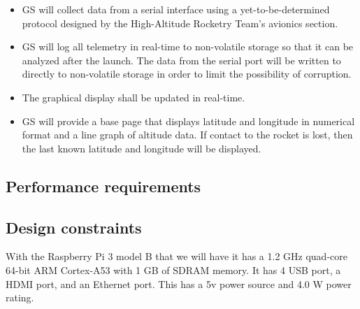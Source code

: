 \documentclass[10pt,journal,draftclsnofoot,onecolumn]{IEEEtran}
\begin{document}
	\begin{itemize}
		\item GS will collect data from a serial interface using a yet-to-be-determined protocol designed by the High-Altitude Rocketry Team's avionics section.
		\item GS will log all telemetry in real-time to non-volatile storage so that it can be analyzed
		after the launch.
		The data from the serial port will be written to directly to non-volatile storage in order to limit
		the possibility of corruption.
		\item The graphical display shall be updated in real-time.
		\item GS will provide a base page that displays latitude and longitude in numerical format and
		a line graph of altitude data.
		If contact to the rocket is lost, then the last known latitude and longitude will be displayed.	


	\end{itemize}
	
	\subsection{Performance requirements}
	\subsection{Design constraints}
	With the Raspberry Pi 3 model B that we will have it has a 1.2 GHz quad-core 64-bit ARM Cortex-A53 
	with 1 GB of SDRAM memory.  It has 4 USB port, a HDMI port, and an Ethernet port.  This has a 5v 
	power source and 4.0 W power rating.
\end{document}
